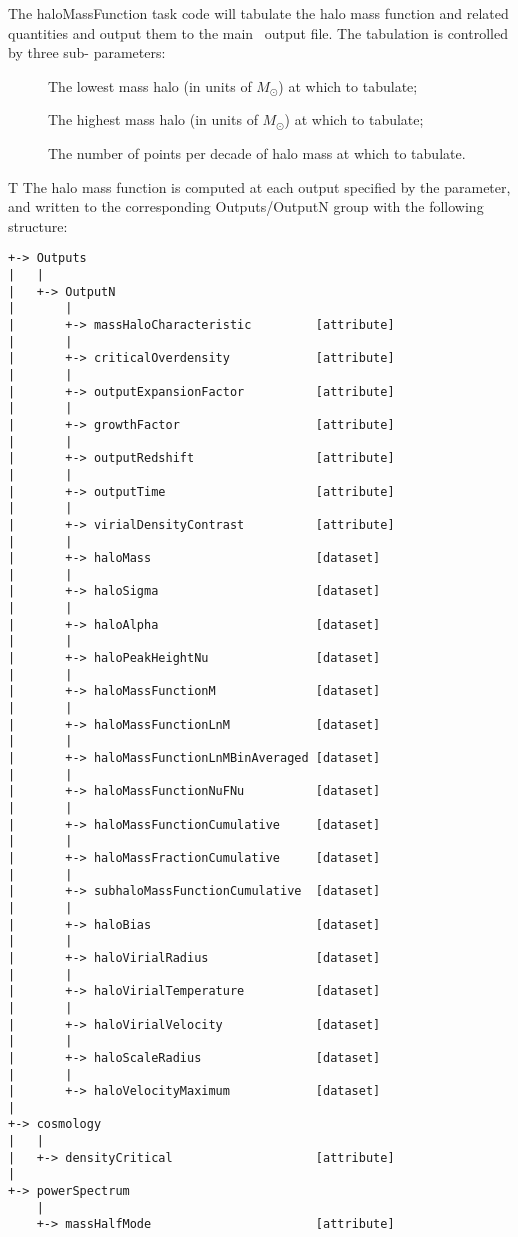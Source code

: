 The {\normalfont \ttfamily haloMassFunction} task code will tabulate the halo mass function and related quantities and output them to the main \glc\ output file. The tabulation is controlled by three sub- parameters:
\begin{description}
\item [{\normalfont \ttfamily [haloMassMinimum]}] The lowest mass halo (in units of $M_\odot$) at which to tabulate;
\item [{\normalfont \ttfamily [haloMassMaximum]}] The highest mass halo (in units of $M_\odot$) at which to tabulate;
\item [{\normalfont \ttfamily [pointsPerDecade]}] The number of points per decade of halo mass at which to tabulate.
\end{description}T
The halo mass function is computed at each output specified by the {\normalfont \ttfamily [outputRedshifts]} parameter, and written to the corresponding {\normalfont \ttfamily Outputs/OutputN} group with the following structure:
\begin{verbatim}
+-> Outputs
|   |
|   +-> OutputN
|       |
|       +-> massHaloCharacteristic         [attribute]
|       |
|       +-> criticalOverdensity            [attribute]
|       |
|       +-> outputExpansionFactor          [attribute]
|       |
|       +-> growthFactor                   [attribute]
|       |
|       +-> outputRedshift                 [attribute]
|       |
|       +-> outputTime                     [attribute]
|       |
|       +-> virialDensityContrast          [attribute]
|       |
|       +-> haloMass                       [dataset]
|       |
|       +-> haloSigma                      [dataset]
|       | 
|       +-> haloAlpha                      [dataset]
|       |
|       +-> haloPeakHeightNu               [dataset]
|       |
|       +-> haloMassFunctionM              [dataset]
|       |
|       +-> haloMassFunctionLnM            [dataset]
|       |
|       +-> haloMassFunctionLnMBinAveraged [dataset]
|       |
|       +-> haloMassFunctionNuFNu          [dataset]
|       |
|       +-> haloMassFunctionCumulative     [dataset]
|       |
|       +-> haloMassFractionCumulative     [dataset]
|       |
|       +-> subhaloMassFunctionCumulative  [dataset]
|       |
|       +-> haloBias                       [dataset]
|       |
|       +-> haloVirialRadius               [dataset]
|       |
|       +-> haloVirialTemperature          [dataset]
|       |
|       +-> haloVirialVelocity             [dataset]
|       |
|       +-> haloScaleRadius                [dataset]
|       |
|       +-> haloVelocityMaximum            [dataset]
|    
+-> cosmology
|   |
|   +-> densityCritical                    [attribute]
|    
+-> powerSpectrum
    |
    +-> massHalfMode                       [attribute]
\end{verbatim}
